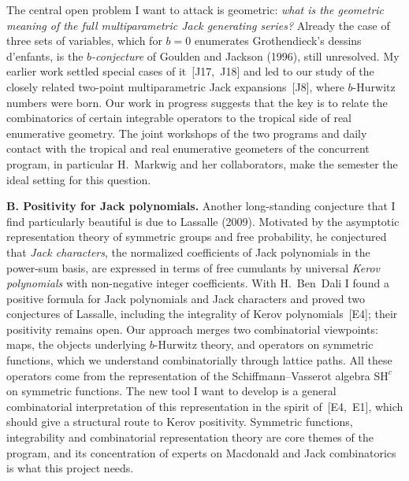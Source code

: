 \documentclass[11pt,a4paper]{amsart}
\newcommand{\proj}[1]{\par\smallskip\noindent\textbf{#1}\;}
\begin{document}
The central open problem I want to attack is geometric: \emph{what is the geometric meaning of the full multiparametric Jack generating series?} Already the case of three sets of variables, which for $b=0$ enumerates Grothendieck's dessins d'enfants, is the \emph{$b$-conjecture} of Goulden and Jackson (1996), still unresolved. My earlier work settled special cases of it~[J17,~J18] and led to our study of the closely related two-point multiparametric Jack expansions~[J8], where $b$-Hurwitz numbers were born. Our work in progress suggests that the key is to relate the combinatorics of certain integrable operators to the tropical side of real enumerative geometry. The joint workshops of the two programs and daily contact with the tropical and real enumerative geometers of the concurrent program, in particular H.~Markwig and her collaborators, make the semester the ideal setting for this question.
 
\proj{B. Positivity for Jack polynomials.}
Another long-standing conjecture that I find particularly beautiful is due to Lassalle (2009). Motivated by the asymptotic representation theory of symmetric groups and free probability, he conjectured that \emph{Jack characters}, the normalized coefficients of Jack polynomials in the power-sum basis, are expressed in terms of free cumulants by universal \emph{Kerov polynomials} with non-negative integer coefficients. With H.~Ben~Dali I found a positive formula for Jack polynomials and Jack characters and proved two conjectures of Lassalle, including the integrality of Kerov polynomials~[E4]; their positivity remains open. Our approach merges two combinatorial viewpoints: maps, the objects underlying $b$-Hurwitz theory, and operators on symmetric functions, which we understand combinatorially through lattice paths. All these operators come from the representation of the Schiffmann--Vasserot algebra $\mathrm{SH}^c$ on symmetric functions. The new tool I want to develop is a general combinatorial interpretation of this representation in the spirit of~[E4,~E1], which should give a structural route to Kerov positivity. Symmetric functions, integrability and combinatorial representation theory are core themes of the program, and its concentration of experts on Macdonald and Jack combinatorics is what this project needs.
 
\end{document}
